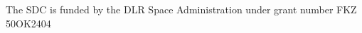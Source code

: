 \documentclass[11pt,twoside]{article}
\begin{document}

\acknowledgements The SDC is funded by the DLR Space Administration under grant number FKZ 50OK2404


\end{document}
